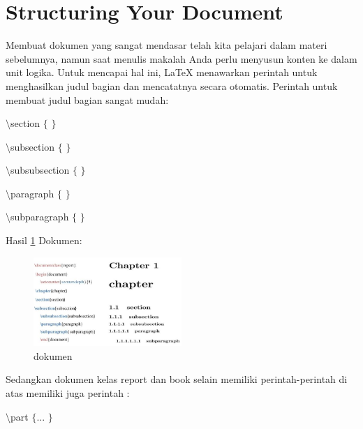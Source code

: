 \section{Structuring Your Document}

\hspace{0.50in} Membuat dokumen yang sangat mendasar telah kita pelajari dalam materi sebelumnya, namun saat menulis makalah Anda perlu menyusun konten ke dalam unit logika. Untuk mencapai hal ini, LaTeX menawarkan perintah untuk menghasilkan judul bagian dan mencatatnya secara otomatis. Perintah untuk membuat judul bagian sangat mudah: \par
{\fontsize{10pt}{10pt}\selectfont  $  \setminus  $section $  \{  $ $  \}  $}
 \par
{\fontsize{10pt}{10pt}\selectfont  $  \setminus  $subsection $  \{  $ $  \}  $}
 \par
{\fontsize{10pt}{10pt}\selectfont  $  \setminus  $subsubsection $  \{  $ $  \}  $}
 \par
{\fontsize{10pt}{10pt}\selectfont  $  \setminus  $paragraph $  \{  $ $  \}  $}
 \par
{\fontsize{10pt}{10pt}\selectfont  $  \setminus  $subparagraph $  \{  $ $  \}  $}
 \par

Hasil \ref{dokumen} Dokumen:
\begin{figure}[ht]
	\centerline{\includegraphics[width=0.50\textwidth]{gambar/dokumen}}
	\caption{dokumen}
	\label{dokumen}
\end{figure}

\vspace{50pt}
\hspace{0.50in} Sedangkan dokumen kelas report dan book selain memiliki perintah-perintah di atas memiliki juga perintah :
 \par
{\fontsize{10pt}{10pt}\selectfont  $  \setminus  $part $  \{  $... $  \}  $}
 \par
\vspace{9pt}

